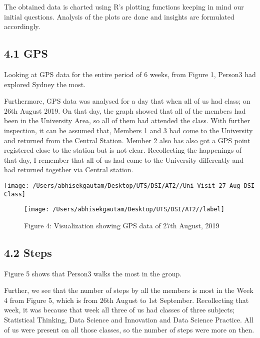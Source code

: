 \documentclass[
]{article}
\begin{document}
The obtained data is charted using R's plotting functions keeping in
mind our initial questions. Analysis of the plots are done and insights
are formulated accordingly.

\hypertarget{gps-2}{%
\subsection{4.1 GPS}\label{gps-2}}

Looking at GPS data for the entire period of 6 weeks, from Figure 1,
Person3 had explored Sydney the most.

Furthermore, GPS data was analysed for a day that when all of us had
class; on 26th August 2019. On that day, the graph showed that all of
the members had been in the University Area, so all of them had attended
the class. With further inspection, it can be assumed that, Members 1
and 3 had come to the University and returned from the Central Station.
Member 2 also has also got a GPS point registered close to the station
but is not clear. Recollecting the happenings of that day, I remember
that all of us had come to the University differently and had returned
together via Central station.

\begin{center}\texttt{[image: /Users/abhisekgautam/Desktop/UTS/DSI/AT2//Uni Visit 27 Aug DSI Class]} \end{center}

\begin{figure}

{\centering \texttt{[image: /Users/abhisekgautam/Desktop/UTS/DSI/AT2//label]} 

}

\caption{\label{fig:figs}Figure 4: Visualization showing GPS data of 27th August, 2019}\label{fig:add_picture91}
\end{figure}

\hypertarget{steps}{%
\subsection{4.2 Steps}\label{steps}}

Figure 5 shows that Person3 walks the most in the group.

Further, we see that the number of steps by all the members is most in
the Week 4 from Figure 5, which is from 26th August to 1st September.
Recollecting that week, it was because that week all three of us had
classes of three subjects; Statistical Thinking, Data Science and
Innovation and Data Science Practice. All of us were present on all
those classes, so the number of steps were more on then.
\end{document}
